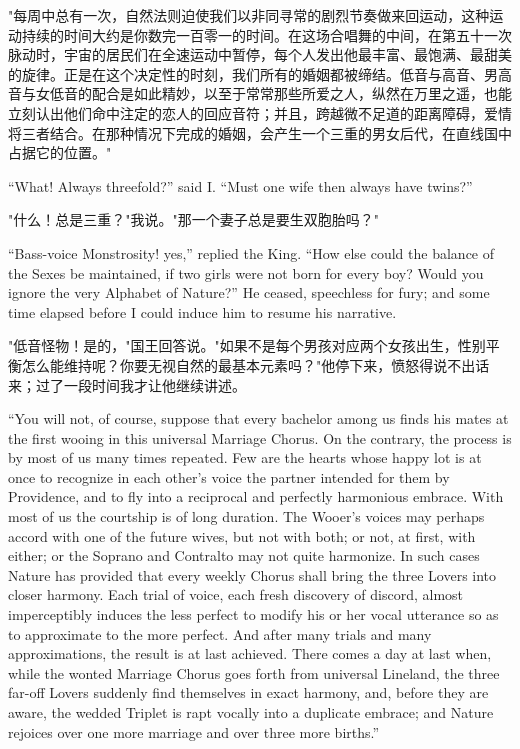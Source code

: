 \documentclass[12pt,UTF8]{ctexbook}
\begin{document}
"每周中总有一次，自然法则迫使我们以非同寻常的剧烈节奏做来回运动，这种运动持续的时间大约是你数完一百零一的时间。在这场合唱舞的中间，在第五十一次脉动时，宇宙的居民们在全速运动中暂停，每个人发出他最丰富、最饱满、最甜美的旋律。正是在这个决定性的时刻，我们所有的婚姻都被缔结。低音与高音、男高音与女低音的配合是如此精妙，以至于常常那些所爱之人，纵然在万里之遥，也能立刻认出他们命中注定的恋人的回应音符；并且，跨越微不足道的距离障碍，爱情将三者结合。在那种情况下完成的婚姻，会产生一个三重的男女后代，在直线国中占据它的位置。"

``What! Always threefold?'' said I. ``Must one wife then always have twins?''

"什么！总是三重？"我说。"那一个妻子总是要生双胞胎吗？"

``Bass-voice Monstrosity! yes,'' replied the King. ``How else could the balance of the Sexes be maintained, if two girls were not born for every boy? Would you ignore the very Alphabet of Nature?'' He ceased, speechless for fury; and some time elapsed before I could induce him to resume his narrative.

"低音怪物！是的，"国王回答说。"如果不是每个男孩对应两个女孩出生，性别平衡怎么能维持呢？你要无视自然的最基本元素吗？"他停下来，愤怒得说不出话来；过了一段时间我才让他继续讲述。

``You will not, of course, suppose that every bachelor among us finds his mates at the first wooing in this universal Marriage Chorus. On the contrary, the process is by most of us many times repeated. Few are the hearts whose happy lot is at once to recognize in each other's voice the partner intended for them by Providence, and to fly into a reciprocal and perfectly harmonious embrace. With most of us the courtship is of long duration. The Wooer's voices may perhaps accord with one of the future wives, but not with both; or not, at first, with either; or the Soprano and Contralto may not quite harmonize. In such cases Nature has provided that every weekly Chorus shall bring the three Lovers into closer harmony. Each trial of voice, each fresh discovery of discord, almost imperceptibly induces the less perfect to modify his or her vocal utterance so as to approximate to the more perfect. And after many trials and many approximations, the result is at last achieved. There comes a day at last when, while the wonted Marriage Chorus goes forth from universal Lineland, the three far-off Lovers suddenly find themselves in exact harmony, and, before they are aware, the wedded Triplet is rapt vocally into a duplicate embrace; and Nature rejoices over one more marriage and over three more births.''
\end{document}
